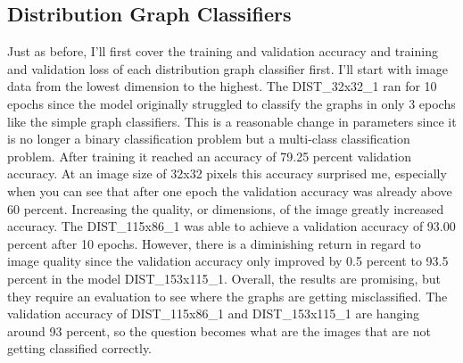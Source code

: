 \documentclass[12pt]{article}
\begin{document}
        \subsection{Distribution Graph Classifiers}

       
            Just as before, I’ll first cover the training and validation accuracy 
            and training and validation loss of each distribution graph classifier first. 
            I’ll start with image data from the lowest dimension to the highest. 
            The DIST\_32x32\_1 ran for 10 epochs since the model originally struggled to classify the graphs in only 3 epochs 
            like the simple graph classifiers. This is a reasonable change in parameters 
            since it is no longer a binary classification problem but a multi-class classification problem. 
            After training it reached an accuracy of 79.25 percent validation accuracy. 
            At an image size of 32x32 pixels this accuracy surprised me, 
            especially when you can see that after one epoch the validation accuracy was already above 60 percent. 
            Increasing the quality, or dimensions, of the image greatly increased accuracy. 
            The DIST\_115x86\_1 was able to achieve a validation accuracy of 93.00 percent after 10 epochs. 
            However, there is a diminishing return in regard to image quality 
            since the validation accuracy only improved by 0.5 percent to 93.5 percent in the model DIST\_153x115\_1. 
            Overall, the results are promising, but they require an evaluation to see where the graphs are getting misclassified. 
            The validation accuracy of DIST\_115x86\_1 and DIST\_153x115\_1 are hanging around 93 percent, 
            so the question becomes what are the images that are not getting classified correctly. 
\end{document}
